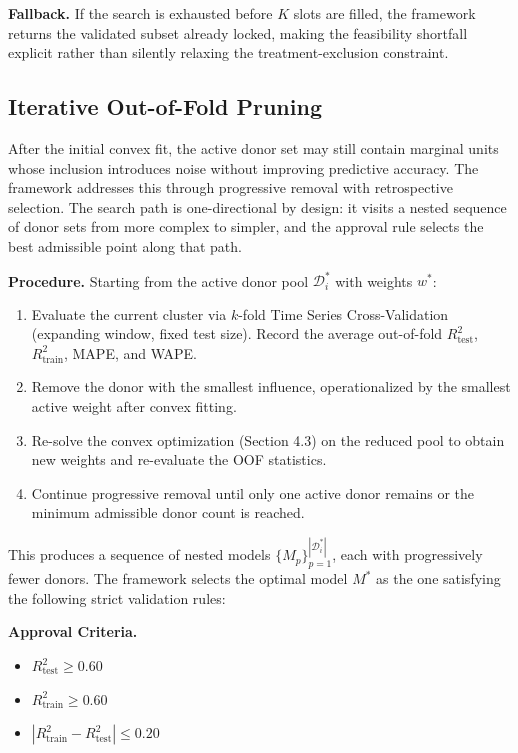 \documentclass[11pt]{article}
\begin{document}
\textbf{Fallback.} If the search is exhausted before $K$ slots are filled, the framework returns the validated subset already locked, making the feasibility shortfall explicit rather than silently relaxing the treatment-exclusion constraint.


\subsection{Iterative Out-of-Fold Pruning}
After the initial convex fit, the active donor set may still contain marginal units whose inclusion introduces noise without improving predictive accuracy. The framework addresses this through progressive removal with retrospective selection. The search path is one-directional by design: it visits a nested sequence of donor sets from more complex to simpler, and the approval rule selects the best admissible point along that path.

\textbf{Procedure.} Starting from the active donor pool $\mathcal{D}_i^*$ with weights $w^*$:

\begin{enumerate}
\item Evaluate the current cluster via $k$-fold Time Series Cross-Validation (expanding window, fixed test size). Record the average out-of-fold $R^2_{\mathrm{test}}$, $R^2_{\mathrm{train}}$, MAPE, and WAPE.
\item Remove the donor with the smallest influence, operationalized by the smallest active weight after convex fitting.
\item Re-solve the convex optimization (Section 4.3) on the reduced pool to obtain new weights and re-evaluate the OOF statistics.
\item Continue progressive removal until only one active donor remains or the minimum admissible donor count is reached.
\end{enumerate}

This produces a sequence of nested models $\{ M_p \}_{p=1}^{|\mathcal{D}_i^*|}$, each with progressively fewer donors. The framework selects the optimal model $M^*$ as the one satisfying the following strict validation rules:

\textbf{Approval Criteria.}

\begin{itemize}
\item $R^2_{\mathrm{test}} \geq 0.60$
\item $R^2_{\mathrm{train}} \geq 0.60$
\item $|R^2_{\mathrm{train}} - R^2_{\mathrm{test}}| \leq 0.20$
\end{itemize}
\end{document}
